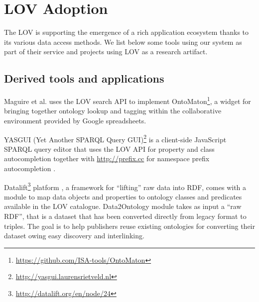 \documentclass{iosart2c}
\begin{document}
\section{LOV Adoption}
\label{sec:lovecosystem}
The LOV is supporting the emergence of a rich application ecosystem thanks to its various data access methods. We list below some tools using our system as part of their service and projects using LOV as a research artifact.
 
\subsection{Derived tools and applications}

Maguire et al. \cite{ontomaton12} uses the LOV search API to implement OntoMaton\footnote{\url{https://github.com/ISA-tools/OntoMaton}}, a widget for bringing together ontology lookup and tagging within the collaborative environment provided by Google spreadsheets. 

YASGUI (Yet Another SPARQL Query GUI)\footnote{\url{http://yasgui.laurensrietveld.nl}} is a client-side JavaScript SPARQL query editor that uses the LOV API for property and class autocompletion together with \url{http://prefix.cc} for namespace prefix autocompletion \cite{yasgui}.

Datalift\footnote{\url{http://datalift.org/en/node/24}} platform \cite{scharffe_2012}, a framework for ``lifting'' raw data into RDF, comes with a module to map data objects and properties to ontology classes and predicates available in the LOV catalogue. Data2Ontology module takes as input a ``raw RDF'', that is a dataset that has been converted directly from legacy format to triples. The goal is to help publishers reuse existing ontologies for converting their dataset owing easy discovery and interlinking. 
\end{document}
